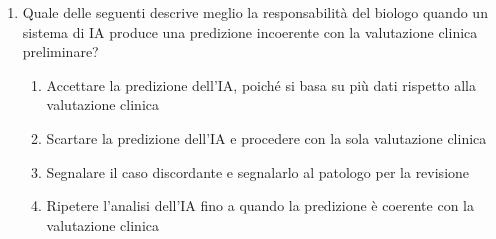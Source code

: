 \begin{enumerate}
  \item \label{ch4:q10} Quale delle seguenti descrive meglio la responsabilità del biologo quando un sistema di IA produce una predizione incoerente con la valutazione clinica preliminare?
  \begin{enumerate}[label=\Alph*.]
    \item Accettare la predizione dell'IA, poiché si basa su più dati rispetto alla valutazione clinica
    \item Scartare la predizione dell'IA e procedere con la sola valutazione clinica
    \item Segnalare il caso discordante e segnalarlo al patologo per la revisione
    \item Ripetere l'analisi dell'IA fino a quando la predizione è coerente con la valutazione clinica
  \end{enumerate}

\end{enumerate}

\begin{figure}[htbp]
  \centering
  
  \label{fig:mindmap_ch4}
\end{figure}